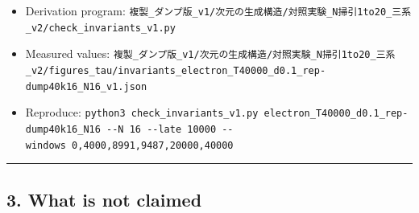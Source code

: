 \documentclass[
  10pt,
]{article}
\providecommand{\tightlist}{%
  \setlength{\itemsep}{0pt}\setlength{\parskip}{0pt}}
\begin{document}
\begin{itemize}
\tightlist
\item
  Derivation program:
  \texttt{複製\_ダンプ版\_v1/次元の生成構造/対照実験\_N掃引1to20\_三系\_v2/check\_invariants\_v1.py}
\item
  Measured values:
  \texttt{複製\_ダンプ版\_v1/次元の生成構造/対照実験\_N掃引1to20\_三系\_v2/figures\_tau/invariants\_electron\_T40000\_d0.1\_rep-dump40k16\_N16\_v1.json}
\item
  Reproduce:
  \texttt{python3\ check\_invariants\_v1.py\ electron\_T40000\_d0.1\_rep-dump40k16\_N16\ -\/-N\ 16\ -\/-late\ 10000\ -\/-windows\ 0,4000,8991,9487,20000,40000}
\end{itemize}

\begin{center}\rule{0.5\linewidth}{0.5pt}\end{center}

\subsection{3. What is not claimed}\label{what-is-not-claimed}
\end{document}
